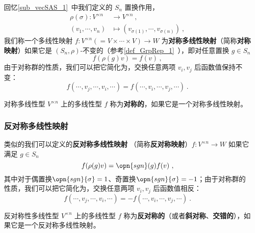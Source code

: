 回忆\autoref{sub_vecSAS_1}~中我们定义的 $S_n$ 置换作用，
\begin{equation}
\begin{aligned}
\rho(\sigma): V^{\times n} &\to V^{\times n}~, \\
(v_1, \cdots, v_n) &\mapsto (v_{\sigma(1)}, \cdots, v_{\sigma(n)})~,
\end{aligned}
\end{equation}
我们称一个多线性映射 $f: V^{\times n} (= V \times \cdots \times V) \to W$ 为\textbf{对称多线性映射}（简称\textbf{对称映射}）如果它是 $(S_n, \rho)$-不变的（参考\autoref{def_GrpRep_1}~），即对任意置换 $g \in S_n$
\begin{equation}
f(\rho(g) v) = f(v)~,
\end{equation}
由于对称群的性质，我们可以把它简化为，交换任意两项 $v_i, v_j$ 后函数值保持不变：
\begin{equation}
f(\cdots, v_j, \cdots, v_i, \cdots) = f(\cdots, v_i, \cdots, v_j, \cdots)~.
\end{equation}




\begin{definition}{对称多线性型}
$V^{\times n}$ 上的多线性型 $f$ 称为\textbf{对称的}，如果它是一个对称多线性映射。
%
\end{definition}

\subsubsection{反对称多线性映射}

类似的我们可以定义的\textbf{反对称多线性映射} （简称\textbf{反对称映射}）$f: V^{\times n} \to W$ 如果它满足 $g \in S_n$
\begin{equation}
f(\rho(g) v) = \opn{sgn}(g) f(v)~,
\end{equation}
其中对于偶置换$\opn{sgn}{\sigma} = 1$、奇置换$\opn{sgn}{\sigma} = -1$；由于对称群的性质，我们可以把它简化为，交换任意两项 $v_i, v_j$ 后函数值相反：
\begin{equation}
f(\cdots, v_j, \cdots, v_i, \cdots) = - f(\cdots, v_i, \cdots, v_j, \cdots)~.
\end{equation}



\begin{definition}{反对称性多线性型}\label{def_MulMap_1}
$V^{\times n}$ 上的多线性型 $f$ 称为\textbf{反对称的}（或者\textbf{斜对称}、\textbf{交错的}），如果它是一个反对称多线性映射。
\end{definition}
